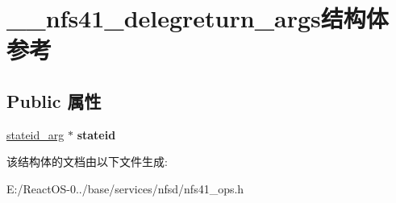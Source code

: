 \hypertarget{struct____nfs41__delegreturn__args}{}\section{\+\_\+\+\_\+nfs41\+\_\+delegreturn\+\_\+args结构体 参考}
\label{struct____nfs41__delegreturn__args}
\subsection*{Public 属性}
\begin{DoxyCompactItemize}
\item 
\mbox{\label{struct____nfs41__delegreturn__args_a3fb45175c1191df44b23bf7a17b701c3}} 
\hyperlink{struct____stateid__arg}{stateid\+\_\+arg} $\ast$ {\bfseries stateid}
\end{DoxyCompactItemize}


该结构体的文档由以下文件生成\+:\begin{DoxyCompactItemize}
\item 
E\+:/\+React\+O\+S-\/0../base/services/nfsd/nfs41\+\_\+ops.\+h\end{DoxyCompactItemize}
